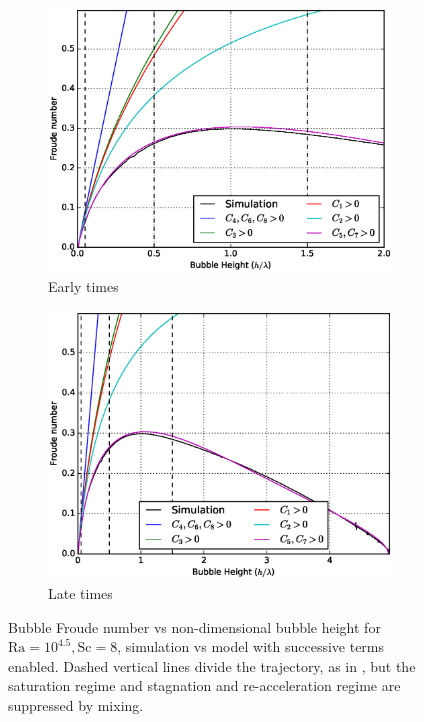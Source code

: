 \begin{figure}
\begin{subfigure}[b]{\columnwidth}
\includegraphics[width=\columnwidth]{figs/Cascade-short-32-4}
\caption{Early times}
\end{subfigure}
\begin{subfigure}[b]{\columnwidth}
\includegraphics[width=\columnwidth]{figs/Cascade-32-4}
\caption{Late times}
\end{subfigure}
\caption{ 
Bubble Froude number vs non-dimensional bubble height for $\text{Ra} = 10^{4.5}, \text{Sc} = 8$, simulation vs model with successive terms enabled.
Dashed vertical lines divide the trajectory, as in , but the saturation regime and stagnation and re-acceleration regime are suppressed by mixing.
}
\end{figure}

